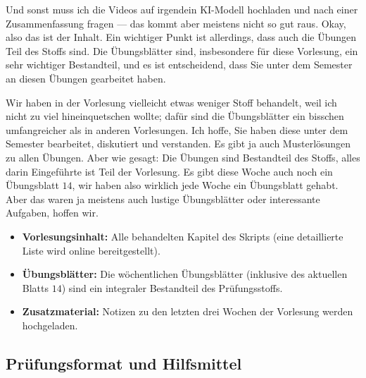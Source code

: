 \begin{spoken-clean}[01:18:37 - 01:20:27]
Und sonst muss ich die Videos auf irgendein KI-Modell hochladen und nach einer Zusammenfassung fragen --- das kommt aber meistens nicht so gut raus. Okay, also das ist der Inhalt. Ein wichtiger Punkt ist allerdings, dass auch die Übungen Teil des Stoffs sind. Die Übungsblätter sind, insbesondere für diese Vorlesung, ein sehr wichtiger Bestandteil, und es ist entscheidend, dass Sie unter dem Semester an diesen Übungen gearbeitet haben.

Wir haben in der Vorlesung vielleicht etwas weniger Stoff behandelt, weil ich nicht zu viel hineinquetschen wollte; dafür sind die Übungsblätter ein bisschen umfangreicher als in anderen Vorlesungen. Ich hoffe, Sie haben diese unter dem Semester bearbeitet, diskutiert und verstanden. Es gibt ja auch Musterlösungen zu allen Übungen. Aber wie gesagt: Die Übungen sind Bestandteil des Stoffs, alles darin Eingeführte ist Teil der Vorlesung. Es gibt diese Woche auch noch ein Übungsblatt $14$, wir haben also wirklich jede Woche ein Übungsblatt gehabt. Aber das waren ja meistens auch lustige Übungsblätter oder interessante Aufgaben, hoffen wir.
\end{spoken-clean}

\begin{nice-box}
\begin{itemize}
    \item \textbf{Vorlesungsinhalt:} Alle behandelten Kapitel des Skripts (eine detaillierte Liste wird online bereitgestellt).
    \item \textbf{Übungsblätter:} Die wöchentlichen Übungsblätter (inklusive des aktuellen Blatts $14$) sind ein integraler Bestandteil des Prüfungsstoffs.
    \item \textbf{Zusatzmaterial:} Notizen zu den letzten drei Wochen der Vorlesung werden hochgeladen.
\end{itemize}
\end{nice-box}

\subsection{Prüfungsformat und Hilfsmittel}

